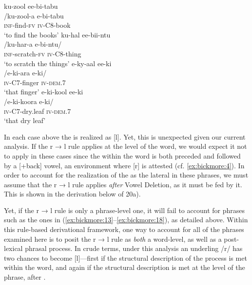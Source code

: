 \documentclass[output=paper,modfonts,nonflat,
 hidelinks
]{langsci/langscibook}
\begin{document}
\ea\label{ex:bickmore:20}
\ea\label{ex:bickmore:20a}
\glll ku-zool ee-bi-tabu\\
      /ku-zool-a e-bi-tabu    \\
\textsc{inf-}\textup{find}\textsc{{}-fv} \textsc{iv-C8-}\textup{book}\\
\glt      ‘to find the books’
\ex\label{ex:bickmore:20b}
\glll  ku-hal ee-bii-ntu    \\
      /ku-har-a e-bi-ntu/	\\
\textsc{inf-}\textup{scratch}\textsc{{}-fv} \textsc{iv-C8-}\textup{thing}\\
\glt      ‘to scratch the things’
\ex\label{ex:bickmore:20c}
\glll e-ky-aal ee-ki    \\
      /e-ki-ara e-ki/	\\
\textsc{iv-C7-}\textup{finger} \textsc{iv-dem.7}\\
\glt      ‘that finger’
\ex\label{ex:bickmore:20d}
\glll e-ki-kool ee-ki    \\
      /e-ki-koora e-ki/	\\
\textsc{iv-C7-}\textup{dry.leaf} \textsc{iv-dem.7}\\
\glt      ‘that dry leaf’
\z
\z

In each case above the  is realized as [l]. Yet, this is unexpected given our current analysis. If the r → l rule applies at the level of the word, we would expect it not to apply in these cases since the  within the word is both preceded and followed by a [+back] vowel, an environment where [r] is attested (cf. \ref{ex:bickmore:4}). In order to account for the realization of the  as the lateral in these phrases, we must assume that the r → l rule applies \textit{after} Vowel Deletion, as it must be fed by it. This is shown in the derivation below of 20a). 

\ea\label{ex:bickmore:21}
\z

Yet, if the r → l rule is only a phrase-level one, it will fail to account for phrases such as the ones in (\ref{ex:bickmore:13}--\ref{ex:bickmore:18}), as detailed above. Within this rule-based derivational framework, one way to account for all of the phrases examined here is to posit the r → l rule as \textit{both} a word-level, as well as a post-lexical phrasal process.%
%
 In crude terms, under this analysis an underling /r/ has two chances to become [l]—first if the structural description of the process is met within the word, and again if the structural description is met at the level of the phrase, after . 
\end{document}
